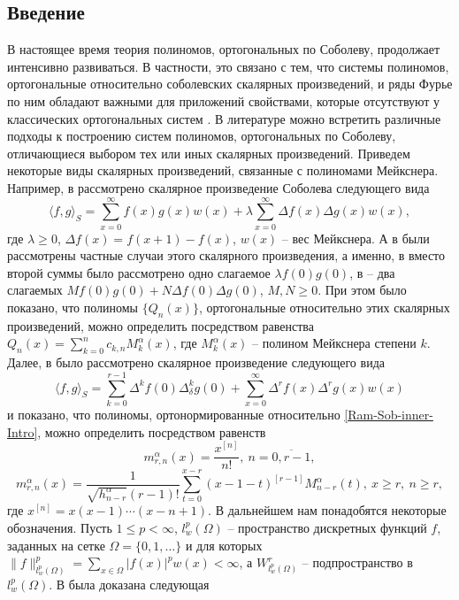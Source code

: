 \subsection{Введение}
В настоящее время теория полиномов, ортогональных по Соболеву, продолжает интенсивно развиваться. В частности, это связано с тем, что системы полиномов, ортогональные относительно соболевских скалярных произведений, и ряды Фурье по ним обладают важными для приложений свойствами, которые отсутствуют у классических ортогональных систем \cite{Ram-Ba-Ra-Pe,Ram-Mar-Xu,Ram-Shar-UMN,Ram-Shar-VMJ}.
В литературе можно встретить различные подходы к построению систем полиномов, ортогональных по Соболеву, отличающиеся выбором тех или иных скалярных произведений.
Приведем некоторые виды скалярных произведений, связанные с полиномами Мейкснера.
Например, в \cite{Ram-Ar-Go-Mar,Ram-Kh-Old} рассмотрено скалярное произведение Соболева следующего вида
$$
\langle f,g\rangle_S=\sum_{x=0}^{\infty}f(x)g(x)w(x)+\lambda\sum_{x=0}^{\infty}\Delta f(x)\Delta g(x)w(x),
$$
где $\lambda\ge 0$, $\Delta f(x)=f(x+1)-f(x)$, $w(x)$ -- вес Мейкснера. А в \cite{Ram-Bav1,Ram-Bav2} были рассмотрены частные случаи этого скалярного произведения, а именно, в \cite{Ram-Bav1} вместо второй суммы было рассмотрено одно слагаемое $\lambda f(0)g(0)$, в \cite{Ram-Bav2} -- два слагаемых $Mf(0)g(0)+N\Delta f(0)\Delta g(0)$, $M,N\ge 0$. При этом было показано, что полиномы $\{Q_n(x)\}$, ортогональные относительно этих скалярных произведений, можно определить посредством равенства $Q_n(x)=\sum_{k=0}^{n}c_{k,n}M_k^\alpha(x)$, где $M_k^\alpha(x)$ -- полином Мейкснера степени $k$. Далее, в \cite{Ram-Shar-VMJ,Ram-Shar-Sar} было рассмотрено скалярное произведение следующего вида
\begin{equation}\label{Ram-Sob-inner-Intro}
\langle f,g\rangle_S=\sum_{k=0}^{r-1}\Delta^kf(0)\Delta_\delta^kg(0)+\sum_{x=0}^\infty\Delta^rf(x)\Delta^rg(x)w(x)
\end{equation}
и показано, что полиномы, ортонормированные относительно \eqref{Ram-Sob-inner-Intro}, можно определить посредством равенств
$$
m_{r,n}^{\alpha}(x)=\frac{x^{[n]}}{n!},\ n=\overline{0,r-1},
$$
$$
m_{r,n}^{\alpha}(x)=
\frac{1}{\sqrt{h_{n-r}^\alpha}(r-1)!}\sum_{t=0}^{x-r}(x-1-t)^{[r-1]}M_{n-r}^\alpha(t),\ x\ge r,\ n\ge r,
$$
где $x^{[n]}=x(x-1)\cdots(x-n+1)$.
В дальнейшем нам понадобятся некоторые обозначения. Пусть $1\le p<\infty$, $l_w^p(\Omega)$ -- пространство дискретных функций $f$, заданных на сетке $\Omega=\{0, 1, \ldots\}$ и для которых $\|f\|_{l_{w}^p(\Omega)}^p=\sum_{x\in\Omega}|f(x)|^pw(x)<\infty$, а $W^r_{l_{w}^p(\Omega)}$ -- подпространство в $l_{w}^p(\Omega)$.
В \cite{Ram-Shar-Sar} была доказана следующая

